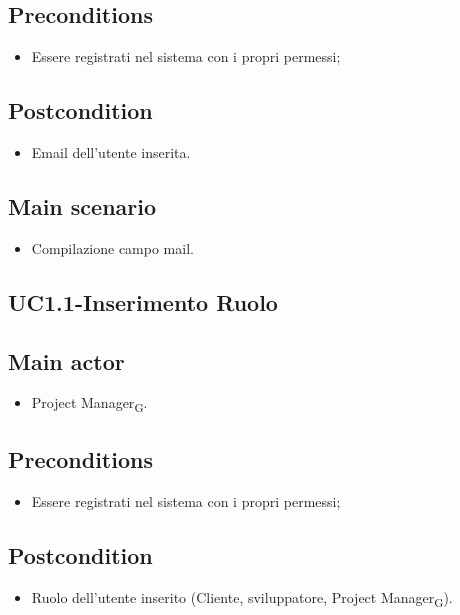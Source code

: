 \documentclass{article}
\begin{document}
     \subsection*{Preconditions} 
        \begin{itemize}
            \item Essere registrati nel sistema con i propri permessi;
        \end{itemize}
        \subsection*{Postcondition} 
        \begin{itemize}
            \item Email dell'utente inserita.
        \end{itemize}
        \subsection*{Main scenario}
        \begin{itemize}
        \item Compilazione campo mail.
        \end{itemize}

\subsection{UC1.1-Inserimento Ruolo}
    
     \subsection*{Main actor}
         \begin{itemize}
             \item Project Manager\textsubscript{G}.
         \end{itemize}
     \subsection*{Preconditions} 
        \begin{itemize}
            \item Essere registrati nel sistema con i propri permessi;
        \end{itemize}
        \subsection*{Postcondition} 
        \begin{itemize}
            \item Ruolo dell'utente inserito (Cliente, sviluppatore, Project Manager\textsubscript{G}).
        \end{itemize}
\end{document}
